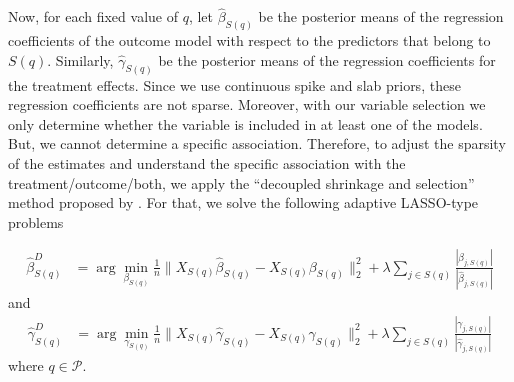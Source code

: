 \documentclass{amsart}
\begin{document}
Now, for each fixed value of $q$, let $\hat{\beta}_{S(q)}$ be the posterior means 
of the regression coefficients of the outcome model with respect to
the predictors that belong to $S(q)$. Similarly,
$\hat{\gamma}_{S(q)}$ be the posterior means of the regression
coefficients for the treatment effects. Since we use continuous 
spike and slab priors, these regression coefficients are not sparse.
Moreover, with our variable selection we only determine whether the variable 
is included in at least one of the models. But, we cannot determine a specific 
association. Therefore, to adjust the sparsity of the estimates and understand
the specific association with the treatment/outcome/both, we apply the 
``decoupled shrinkage and selection'' method proposed by \cite{hahn2015}. 
For that, we solve the following adaptive LASSO-type \cite{Zou2006}
problems

\begin{align}
	\hat{\beta}^D_{S(q)} &= 
	\arg\min_{\beta_{S(q)}} \frac{1}{n}\|X_{S(q)}\hat{\beta}_{S(q)}
	- X_{S(q)} \beta_{S(q)}\|_2^2 + \lambda\sum_{j\in S(q)} 
	\frac{|\beta_{j,S(q)}|}{|\hat{\beta}_{j,S(q)}|}
\end{align}
and
\begin{align}
	\hat{\gamma}^D_{S(q)} &= 
	\arg\min_{\gamma_{S(q)}} \frac{1}{n}\|X_{S(q)}\hat{\gamma}_{S(q)}
	- X_{S(q)} \gamma_{S(q)}\|_2^2 + \lambda\sum_{j\in S(q)} 
	\frac{|\gamma_{j,S(q)}|}{|\hat{\gamma}_{j,S(q)}|}
\end{align}
where $q\in \mathcal{P}$.

\end{document}
